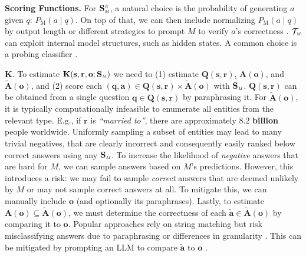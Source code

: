 \textbf{Scoring Functions.}
For $\mathbf{S_{\text{\tiny \emph{M}}}^{\text{\tiny \emph{E}}}}$, a natural choice is the probability of generating $a$ given $q$:  
$P_{\text{M}}(a \mid q)$. On top of that, we can then include normalizing $P_{\text{M}}(a \mid q)$ by output length \citep{wang2023selfconsistency} or different strategies to prompt $M$ to verify $a$'s correctness \citep{kadavath2022language}.  
$\mathcal{T}_{\text{\tiny \emph{M}}}$ can exploit internal model structures, such as hidden states. 
A common choice is a probing classifier 
\citep{hupkes2018jair,belinkov2019tacl}. 



$\mathbf{K}.$
To estimate $\mathbf{K(s,r,o;S_{\text{\tiny \emph{M}}}})$ we need to (1) estimate $\mathbf{Q(s,r)}$, $\mathbf{A(o)}$, and $\mathbf{\tilde{A}(o)}$, and (2) score each $(\mathbf{q},\mathbf{a}) \in \mathbf{Q(s,r)} \times \mathbf{\tilde{A}(o)}$ with $\mathbf{S}_{\text{\tiny \emph{M}}}$.
$\mathbf{Q(s,r)}$ can be obtained from a single question $\mathbf{q \in Q(s,r)}$ by paraphrasing it. For $\mathbf{\tilde{A}(o)}$, it is typically 
computationally infeasible to enumerate all entities from the relevant type. E.g., if $\mathbf{r}$ is \textit{``married to''}, there are approximately $\mathbf{8.2}$ \textbf{billion} people worldwide. 
Uniformly sampling a subset of entities may lead to many trivial negatives, that are clearly incorrect and consequently easily ranked below correct answers using any $\mathbf{S}_{\text{\tiny \emph{M}}}$.
To increase the likelihood of \textit{negative} answers that are hard for $M$, we can sample answers based on $M$'s predictions. 
However, this introduces a risk: we may fail to sample \textit{correct} answers that are deemed unlikely by $M$ or may not sample correct answers at all. To mitigate this, we can manually include $\mathbf{o}$ (and optionally its paraphrases). Lastly, to estimate $\mathbf{A(o)} \subseteq \mathbf{\tilde{A}(o)}$, we must determine the correctness of each $\mathbf{\tilde{a}} \in \mathbf{\tilde{A}(o)}$ by comparing it to $\mathbf{o}$. Popular approaches rely on string matching but risk misclassifying answers due to paraphrasing or differences in granularity \citep{EM_1, GRANOLA}. 
This can be mitigated by prompting an LLM to compare $\mathbf{\tilde{a}}$ to $\mathbf{o}$ \citep{SimpleQA}.

